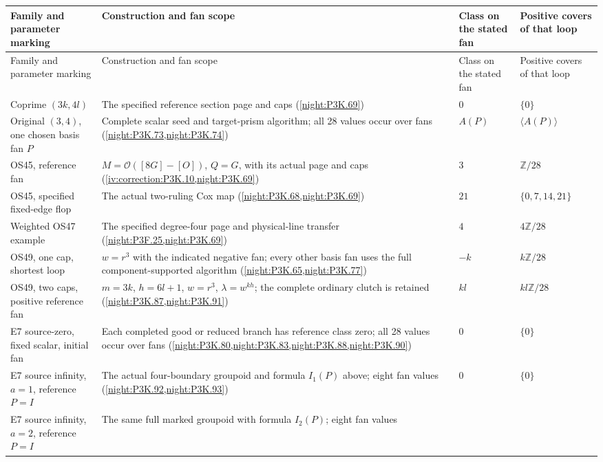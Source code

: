 \begingroup
\small
\setlength{\tabcolsep}{4pt}
\renewcommand{\arraystretch}{1.18}
\begin{longtable}{@{}p{.23\linewidth}p{.37\linewidth}p{.16\linewidth}p{.17\linewidth}@{}}
\toprule
Family and parameter marking & Construction and fan scope
 & Class on the stated fan & Positive covers of that loop\\
\midrule
\endfirsthead
\toprule
Family and parameter marking & Construction and fan scope
 & Class on the stated fan & Positive covers of that loop\\
\midrule
\endhead
\bottomrule
\endfoot
Coprime $(3k,4l)$ & The specified reference section page and caps
  (\cref{night:P3K.69}) & $0$ & $\{0\}$\\
Original $(3,4)$, one chosen basis fan $P$ & Complete scalar
  seed and target-prism algorithm; all 28 values occur over fans
  (\cref{night:P3K.73,night:P3K.74})
  & $A(P)$ & $\langle A(P)\rangle$\\
OS45, reference fan & $M=\mathcal O([8G]-[O])$, $Q=G$,
  with its actual page and caps
  (\cref{iv:correction:P3K.10,night:P3K.69})
  & $3$ & $\mathbb Z/28$\\
OS45, specified fixed-edge flop & The actual two-ruling Cox map
  (\cref{night:P3K.68,night:P3K.69})
  & $21$ & $\{0,7,14,21\}$\\
Weighted OS47 example & The specified degree-four page and
  physical-line transfer (\cref{night:P3F.25,night:P3K.69})
  & $4$ & $4\mathbb Z/28$\\
OS49, one cap, shortest loop & $w=r^3$ with the indicated
  negative fan; every other basis fan uses the full component-supported
  algorithm (\cref{night:P3K.65,night:P3K.77})
  & $-k$ & $k\mathbb Z/28$\\
OS49, two caps, positive reference fan & $m=3k$, $h=6l+1$,
  $w=r^3$, $\lambda=w^{kh}$; the complete ordinary clutch is retained
  (\cref{night:P3K.87,night:P3K.91})
  & $kl$ & $kl\mathbb Z/28$\\
E7 source-zero, fixed scalar, initial fan & Each completed good
  or reduced branch has reference class zero; all 28 values occur
  over fans (\cref{night:P3K.80,night:P3K.83,night:P3K.88,night:P3K.90})
  & $0$ & $\{0\}$\\
E7 source infinity, $a=1$, reference $P=I$ & The actual four-boundary
  groupoid and formula $I_1(P)$ above; eight fan values
  (\cref{night:P3K.92,night:P3K.93})
  & $0$ & $\{0\}$\\
E7 source infinity, $a=2$, reference $P=I$ & The same full
  marked groupoid with formula $I_2(P)$; eight fan values

\end{longtable}
